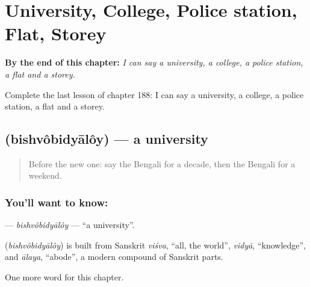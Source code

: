 
\chapter{University, College, Police station, Flat, Storey}
\label{ch:bn-university-college-police-station-flat-storey}

\begin{chapteropening}
\textbf{By the end of this chapter:} \emph{I can say a university, a college, a police station, a flat and a storey.}

Complete the last lesson of chapter 188: I can say a university, a college, a police station, a flat and a storey.
\end{chapteropening}

\section[\texorpdfstring{\bn{বিশ্ববিদ্যালয়} (bishvôbidyālôy)}{বিশ্ববিদ্যালয় (bishvôbidyālôy)}]{ (bishvôbidyālôy) — a university}

\label{lesson:BN-C188-bishvobidyaloy}



\begin{quote}
Before the new one: say the Bengali for a decade, then the Bengali for a weekend.
\end{quote}

\subsection*{You'll want to know: }
\textbf{} — \emph{bishvôbidyālôy} — \textquotedblleft{}a university\textquotedblright{}.

\begin{cousinweb}
\textbf{} (\emph{bishvôbidyālôy}) is built from Sanskrit \emph{viśva}, \textquotedblleft{}all, the world\textquotedblright{}, \emph{vidyā}, \textquotedblleft{}knowledge\textquotedblright{}, and \emph{ālaya}, \textquotedblleft{}abode\textquotedblright{}, a modern compound of Sanskrit parts.
\end{cousinweb}

\begin{grammarlens}[title={What you've built}]
One more word for this chapter.
\end{grammarlens}


